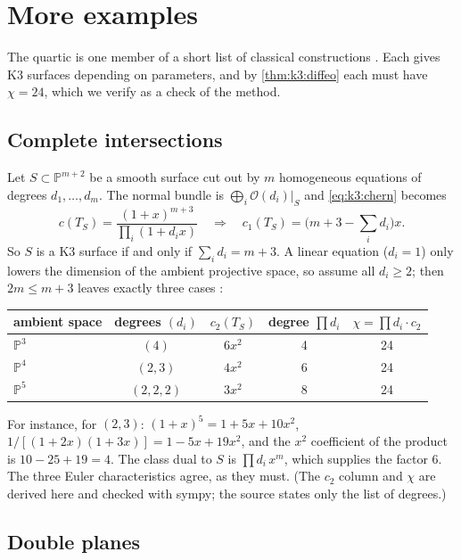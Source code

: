 \section{More examples}\label{sec:k3:examples}

The quartic is one member of a short list of classical constructions
. Each gives K3 surfaces depending on parameters,
and by \cref{thm:k3:diffeo} each must have $\chi=24$, which we verify as a check of the method.

\subsection{Complete intersections}

Let $S\subset\mathbb{P}^{m+2}$ be a smooth surface cut out by $m$ homogeneous equations of
degrees $d_1,\dots,d_m$. The normal bundle is $\bigoplus_i\mathcal{O}(d_i)|_S$ and
\eqref{eq:k3:chern} becomes
\begin{equation}\label{eq:k3:ci}
  c(T_S)=\frac{(1+x)^{m+3}}{\prod_{i}(1+d_ix)}
  \quad\Longrightarrow\quad
  c_1(T_S)=\Big(m+3-\sum_i d_i\Big)x .
\end{equation}
So $S$ is a K3 surface if and only if $\sum_id_i=m+3$. A linear equation ($d_i=1$) only lowers
the dimension of the ambient projective space, so assume all $d_i\ge2$; then $2m\le m+3$ leaves
exactly three cases :
\begin{center}
\begin{tabular}{@{}lcccc@{}}
\toprule
ambient space & degrees $(d_i)$ & $c_2(T_S)$ & degree $\prod d_i$ & $\chi=\prod d_i\cdot c_2$\\
\midrule
$\mathbb{P}^3$ & $(4)$ & $6x^2$ & 4 & 24\\
$\mathbb{P}^4$ & $(2,3)$ & $4x^2$ & 6 & 24\\
$\mathbb{P}^5$ & $(2,2,2)$ & $3x^2$ & 8 & 24\\
\bottomrule
\end{tabular}
\end{center}
For instance, for $(2,3)$: $(1+x)^5=1+5x+10x^2$, $1/[(1+2x)(1+3x)]=1-5x+19x^2$, and the $x^2$
coefficient of the product is $10-25+19=4$. The class dual to $S$ is $\prod d_i\,x^m$, which
supplies the factor $6$. The three Euler characteristics agree, as they must. (The
$c_2$ column and $\chi$ are derived here and checked with sympy; the source states only the
list of degrees.)

\subsection{Double planes}

